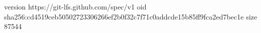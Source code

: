 version https://git-lfs.github.com/spec/v1
oid sha256:cd4519ceb50502723306266ef2b0f32c7f71c0addcde15b85ff9fca2ed7bec1e
size 87544
